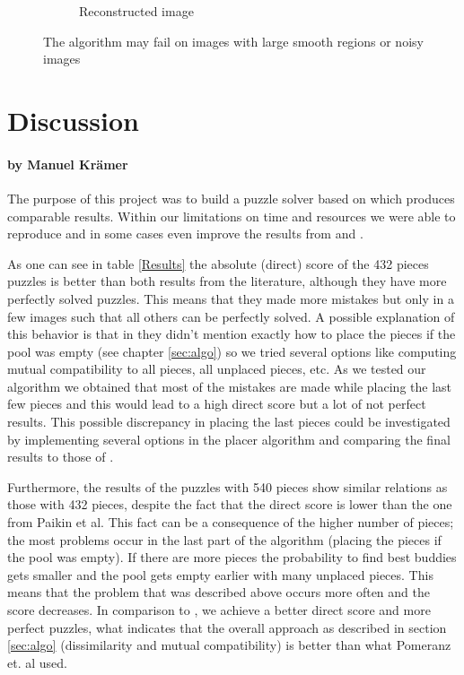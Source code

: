\documentclass[11pt]{report}
\begin{document}
\begin{figure}
\begin{subfigure}{0.45\textwidth}
		\caption{Reconstructed image}
		\label{img:540_8_reconstructed}
	\end{subfigure}
  \caption{The algorithm may fail on images with large smooth regions or noisy images}
  \label{fig:fail}
\end{figure}

\chapter{Discussion}
\subsubsection*{by Manuel Krämer}

The purpose of this project was to build a puzzle solver based on \cite{Paikin2015} which produces comparable results. Within our limitations on time and resources we were able to reproduce and in some cases even improve the results from \cite{Paikin2015} and \cite{Pomeranz2011}.

As one can see in table \ref{Results} the absolute (direct) score of the 432 pieces puzzles is better than both results from the literature, although they have more perfectly solved puzzles. This means that they made more mistakes but only in a few images such that all others can be perfectly solved. A possible explanation of this behavior is that in \cite{Paikin2015} they didn't mention exactly how to place the pieces if the pool was empty (see chapter \ref{sec:algo}) so we tried several options like computing mutual compatibility to all pieces, all unplaced pieces, etc. As we tested our algorithm we obtained that most of the mistakes are made while placing the last few pieces and this would lead to a high direct score but a lot of not perfect results. This possible discrepancy in placing the last pieces could be investigated by implementing several options in the placer algorithm and comparing the final results to those of \cite{Paikin2015}.

Furthermore, the results of the puzzles with 540 pieces show similar relations as those with 432 pieces, despite the fact that the direct score is lower than the one from Paikin et al. This fact can be a consequence of the higher number of pieces; the most problems occur in the last part of the algorithm (placing the pieces if the pool was empty). If there are more pieces the probability to find best buddies gets smaller and the pool gets empty earlier with many unplaced pieces. This means that the problem that was described above occurs more often and the score decreases. In comparison to \cite{Pomeranz2011}, we achieve a better direct score and more perfect puzzles, what indicates that the overall approach as described in section \ref{sec:algo} (dissimilarity and mutual compatibility) is better than what Pomeranz et. al used.
\end{document}
